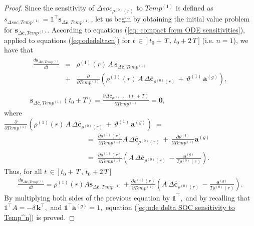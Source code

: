  \begin{proof}
Since the sensitivity of $\Delta soc_{\rho^{(0)}(r)}$ to $Temp^{(1)}$ is defined as $s_{\Delta soc,Temp^{(1)}}= \mathds{1}^\intercal \mathbf{s}_{\Delta \mathbf{\overline c},Temp^{(1)}}  $, let us begin by obtaining the initial value problem for $\mathbf{s}_{\Delta \mathbf{\overline c},Temp^{(1)}}$. According to equations (\ref{eq: compact form ODE sensitivities}), applied to equations (\ref{eq:odedeltacn}) for $t\,\in\,]\,t_0+\,T \,,\,t_0+2\,T\,]$ (i.e. $n=1$), we have that
\begin{equation}\label{eq:ivp sens delta c to temp}
\begin{array}{l}
\begin{array}{ccl}
\displaystyle \frac{d\mathbf{s}_{\Delta \mathbf{\overline c},Temp^{(1)}} }{dt}&=&\rho^{(1)}(r)\, A\, \mathbf{s}_{\Delta \mathbf{\overline c},Temp^{(1)}}\\
&+&
\displaystyle \frac{\partial}{\partial Temp^{(1)}}\left(\rho^{(1)}(r)\,  A \, \Delta \mathbf{\overline c}_{\rho^{(0)}(r)}\,+\,\vartheta^{(1)}\,  \mathbf{a}^{(g)} \right), 
\end{array}\\\\
\mathbf{s}_{\Delta \mathbf{\overline c},Temp^{(1)}}(t_0+T)=\displaystyle \frac{\partial \Delta\mathbf{\overline c}_{\rho^{(0)}(r)}(t_0+T)}{\partial Temp^{(1)}}=\mathbf{0},
\end{array}
\end{equation}
where\\

$\displaystyle \frac{\partial}{\partial Temp^{(1)}} \left(\rho^{(1)}(r)\,  A \, \Delta \mathbf{\overline c}_{\rho^{(0)}(r)}\,+\,\vartheta^{(1)}\,  \mathbf{a}^{(g)} \right)\;=\;$
$$\begin{array}{ll}
\qquad\qquad\;&=\;  \displaystyle \frac{\partial \rho^{(1)}(r) }{\partial Temp^{(1)}} A \, \Delta \mathbf{\overline c}_{\rho^{(0)}(r)}\,+\, \displaystyle \frac{\partial \vartheta^{(1)}}{\partial Temp^{(1)}} \mathbf{a}^{(g)}\\\\
&=\; \displaystyle \frac{\partial \rho^{(1)}(r) }{\partial Temp^{(1)}}\left(  A \, \Delta \mathbf{\overline c}_{\rho^{(0)}(r)}\,-\displaystyle \frac{\mathbf{a}^{(g)}}{T\rho^{(0)}(r)} \right).
\end{array}$$
Thus, for all $t\,\in\,]\,t_0+\,T \,,\,t_0+2\,T\,]$
$$
\begin{array}{l}
\displaystyle \frac{d\mathbf{s}_{\Delta \mathbf{\overline c},Temp^{(1)}} }{dt}= \rho^{(1)}(r) A \mathbf{s}_{\Delta \mathbf{\overline c},Temp^{(1)}}+
\displaystyle \frac{\partial \rho^{(1)}(r) }{\partial Temp^{(1)}}\left(  A \, \Delta \mathbf{\overline c}_{\rho^{(0)}(r)}\,-\displaystyle \frac{\mathbf{a}^{(g)}}{T\rho^{(0)}(r)} \right).
\end{array}
$$
By multiplying both sides of the previous equation by $\mathds{1}^\intercal,$ and by recalling that $\mathds{1}^\intercal A = -\delta \,\mathbf{k}^\intercal,$ and $ \mathds{1}^\intercal \mathbf{a}^{(g)}=1,$ equation (\ref{eq:ode delta SOC sensitivity to Temp^n}) is proved.


\end{proof}
